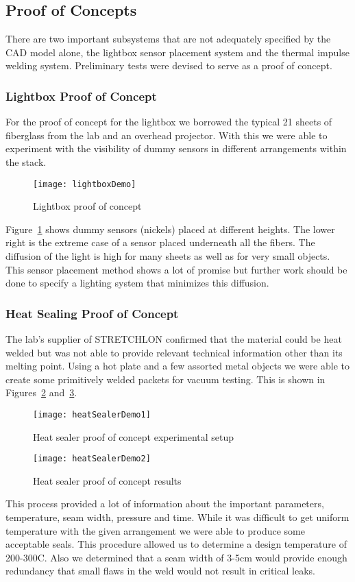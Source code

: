 \documentclass[12pt,letterpaper,notitlepage]{article}
\begin{document}
\subsection{Proof of Concepts}
There are two important subsystems that are not adequately specified by the CAD model alone, the lightbox sensor placement system and the thermal impulse welding system. Preliminary tests were devised to serve as a proof of concept.
\subsubsection{Lightbox Proof of Concept}
For the proof of concept for the lightbox we borrowed the typical 21 sheets of fiberglass from the lab and an overhead projector. With this we were able to experiment with the visibility of dummy sensors in different arrangements within the stack.\\
\begin{figure}[H]
\centering
\texttt{[image: lightboxDemo]}
\label{fig:lightboxDemo}
\caption{Lightbox proof of concept}
\end{figure}
Figure~\ref{fig:lightboxDemo} shows dummy sensors (nickels) placed at different heights. The lower right is the extreme case of a sensor placed underneath all the fibers. The diffusion of the light is high for many sheets as well as for very small objects. This sensor placement method shows a lot of promise but further work should be done to specify a lighting system that minimizes this diffusion.
\subsubsection{Heat Sealing Proof of Concept}
The lab's supplier of STRETCHLON confirmed that the material could be heat welded but was not able to provide relevant technical information other than its melting point. Using a hot plate and a few assorted metal objects we were able to create some primitively welded packets for vacuum testing. This is shown in Figures~\ref{fig:heatSealerDemo1} and~\ref{fig:heatSealerDemo2}.
\begin{figure}[H]
\centering
\texttt{[image: heatSealerDemo1]}
\label{fig:heatSealerDemo1}
\caption{Heat sealer proof of concept experimental setup}
\end{figure}
\begin{figure}[H]
\centering
\texttt{[image: heatSealerDemo2]}
\label{fig:heatSealerDemo2}
\caption{Heat sealer proof of concept results}
\end{figure}
This process provided a lot of information about the important parameters, temperature, seam width, pressure and time. While it was difficult to get uniform temperature with the given arrangement we were able to produce some acceptable seals. This procedure allowed us to determine a design temperature of 200-300C. Also we determined that a seam width of 3-5cm would provide enough redundancy that small flaws in the weld would not result in critical leaks.
\end{document}
